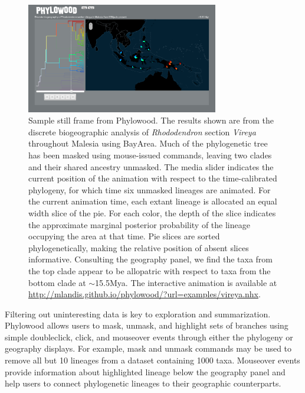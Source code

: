 \documentclass{bioinfo}
\begin{document}
\begin{figure}
\begin{center}
\includegraphics[width=3.3in]{phylowood.png}
\caption{
Sample still frame from Phylowood. The results shown are from the discrete biogeographic analysis of {\it Rhododendron} section {\it Vireya} throughout Malesia using BayArea. Much of the phylogenetic tree has been masked using mouse-issued commands, leaving two clades and their shared ancestry unmasked. The media slider indicates the current position of the animation with respect to the time-calibrated phylogeny, for which time six unmasked lineages are animated.  For the current animation time, each extant lineage is allocated an equal width slice of the pie. For each color, the depth of the slice indicates the approximate marginal posterior probability of the lineage occupying the area at that time. Pie slices are sorted phylogenetically, making the relative position of absent slices informative. Consulting the geography panel, we find the taxa from the top clade appear to be allopatric with respect to taxa from the bottom clade at $\sim$15.5Mya. The interactive animation is available at \href{http://mlandis.github.io/phylowood/?url=examples/vireya.nhx}{http://mlandis.github.io/phylowood/?url=examples/vireya.nhx}.
}
\label{phylowood}
\end{center}
\end{figure}


Filtering out uninteresting data is key to exploration and summarization. Phylowood allows users to mask, unmask, and highlight sets of branches using simple doubleclick, click, and mouseover events through either the phylogeny or geography displays. For example, mask and unmask commands may be used to remove all but 10 lineages from a dataset containing 1000 taxa. Mouseover events provide information about highlighted lineage below the geography panel and help users to connect phylogenetic lineages to their geographic counterparts.
\end{document}
